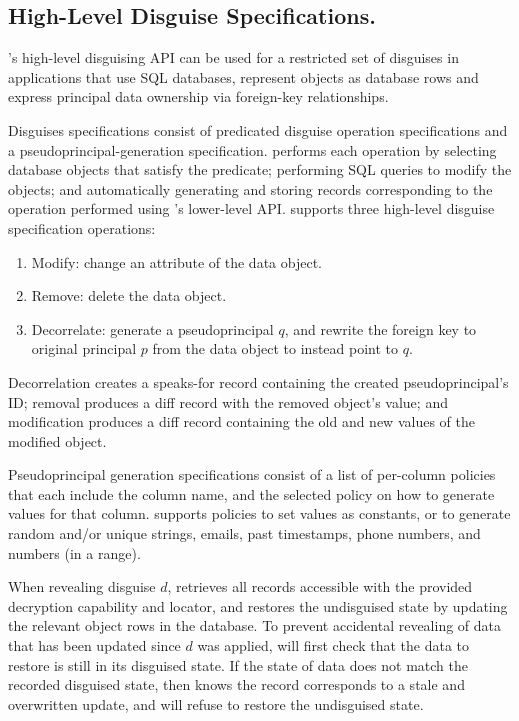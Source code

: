 \subsection{High-Level Disguise Specifications.}
\sys's high-level disguising API can be used for a restricted set of disguises in applications that
use SQL databases, represent objects as database rows and express principal data ownership via
foreign-key relationships.

Disguises specifications consist of predicated disguise operation specifications and a
pseudoprincipal-generation specification.
\sys performs each operation by selecting database objects that satisfy the predicate; performing SQL queries to modify the objects; and automatically generating and storing records corresponding to the operation performed using \sys's lower-level API.  \sys supports three high-level disguise specification
operations:
\begin{enumerate}[nosep]
    \item Modify: change an attribute of the data object.
    \item Remove: delete the data object.
    \item Decorrelate: generate a pseudoprincipal $q$, and rewrite the foreign key to original
        principal $p$ from the data object to instead point to $q$.
\end{enumerate}
Decorrelation creates a speaks-for record  containing the created pseudoprincipal's
ID; removal produces a diff record  with the removed object's value; and modification
produces a diff record  containing the old and new values of the modified object.

Pseudoprincipal generation specifications consist of a list of per-column policies that each
include the column name, and the selected policy on how to generate values for that column.
\sys supports policies to set values as constants, or to generate random and/or unique strings, emails, past timestamps, phone
numbers, and numbers (in a range).

When revealing disguise $d$, \sys retrieves all records accessible with the provided decryption capability
and locator, and restores the undisguised state by updating the relevant object rows in the database.
To prevent accidental revealing of data that has been updated since $d$ was applied,
\sys will first check that the data to restore is still in its disguised state. If the state of data does
not match the recorded disguised state, then \sys knows the record corresponds to a stale and
overwritten update, and will refuse to restore the undisguised state.

